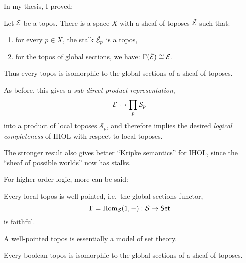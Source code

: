 \documentclass[lambek.tex]{subfiles}
\begin{document}
In my thesis, I proved:

\begin{theorem}[A. 1998]
Let $\mathcal{E}$ be a topos.  
There is a space $X$ with a sheaf of toposes $\tilde{\mathcal{E}}$ such that:
\begin{enumerate}
\item for every $p\in X$, the stalk $\tilde{\mathcal{E}}_p$ is a  topos, 
\item for the topos of global sections, we have: $\Gamma(\tilde{\mathcal{E}}) \cong \mathcal{E}$.
\end{enumerate}
Thus every topos is isomorphic to the global sections of a sheaf of  toposes.  
\end{theorem}
\medskip

As before, this gives a \emph{sub-direct-product representation},
\[
\mathcal{E} \rightarrowtail \prod_{p}\mathcal{S}_p
\]
into a product of local toposes $\mathcal{S}_p$, and therefore implies the desired \emph{logical completeness} of IHOL with respect to local toposes.  

The stronger result also gives better ``Kripke semantics'' for IHOL, since the ``sheaf of possible worlds'' now has  stalks.
\medskip

For  higher-order logic, more can be said:

\begin{lemma}
Every local  topos is well-pointed, i.e.\ the global sections functor,
\[
\Gamma = \mathrm{Hom}_\mathcal{S}(1, - ) : \mathcal{S} \to \mathsf{Set}
\]
is faithful.
\end{lemma}

A well-pointed topos is essentially a model of set theory.  

\begin{corollary}
Every boolean topos is isomorphic to the global sections of a sheaf of  toposes.  
\end{corollary}

\end{document}
